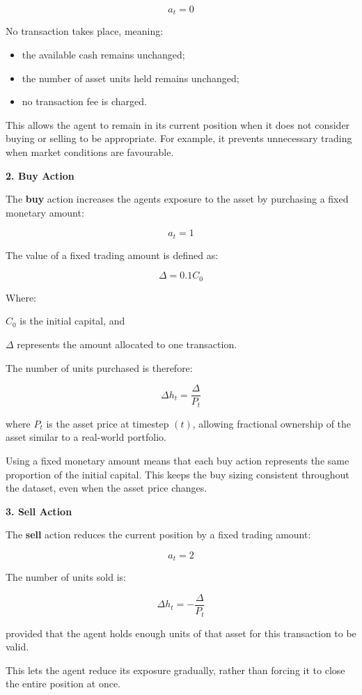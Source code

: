 \[a_{t} = 0\]

No transaction takes place, meaning:

\begin{itemize}
\item
  the available cash remains unchanged;
\item
  the number of asset units held remains unchanged;
\item
  no transaction fee is charged.
\end{itemize}

This allows the agent to remain in its current position when it does not
consider buying or selling to be appropriate. For example, it prevents
unnecessary trading when market conditions are favourable.

\textbf{2. Buy Action}

The \textbf{buy} action increases the agent\textquotesingle s exposure
to the asset by purchasing a fixed monetary amount:

\[a_{t} = 1\]

The value of a fixed trading amount is defined as:

\[\Delta = 0.1C_{0}\]

Where:

\(C_{0}\) is the initial capital, and

\(\Delta\) represents the amount allocated to one transaction.

The number of units purchased is therefore:

\[\Delta h_{t} = \frac{\Delta}{P_{t}}\]

where \(P_{t}\) is the asset price at timestep \((t)\), allowing
fractional ownership of the asset similar to a real-world portfolio.

Using a fixed monetary amount means that each buy action represents the
same proportion of the initial capital. This keeps the buy sizing
consistent throughout the dataset, even when the asset price changes.

\textbf{3. Sell Action}

The \textbf{sell} action reduces the current position by a fixed trading
amount:

\[a_{t} = 2\]

The number of units sold is:

\[\Delta h_{t} = - \frac{\Delta}{P_{t}}\]

provided that the agent holds enough units of that asset for this
transaction to be valid.

This lets the agent reduce its exposure gradually, rather than forcing
it to close the entire position at once.

